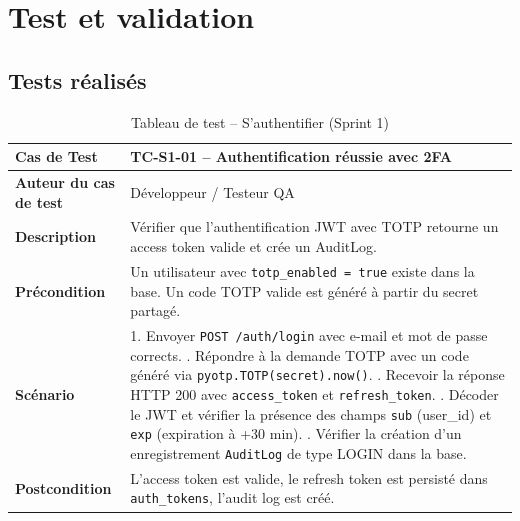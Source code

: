 \section{Test et validation}

\subsection{Tests réalisés}

\begin{table}[H]
\centering
\caption{Tableau de test -- S'authentifier (Sprint 1)}
\label{tab:test-sprint1-auth}
\small
\renewcommand{\arraystretch}{1.3}
\begin{tabularx}{\textwidth}{>{\bfseries}p{3.5cm} X}
\hline
Cas de Test & TC-S1-01 -- Authentification réussie avec 2FA \\
\hline
Auteur du cas de test & Développeur / Testeur QA \\
\hline
Description & Vérifier que l'authentification JWT avec TOTP retourne un access token valide et crée un AuditLog. \\
\hline
Précondition & Un utilisateur avec \texttt{totp\_enabled = true} existe dans la base. Un code TOTP valide est généré à partir du secret partagé. \\
\hline
Scénario &
1. Envoyer \texttt{POST /auth/login} avec e-mail et mot de passe corrects. \newline
2. Répondre à la demande TOTP avec un code généré via \texttt{pyotp.TOTP(secret).now()}. \newline
3. Recevoir la réponse HTTP 200 avec \texttt{access\_token} et \texttt{refresh\_token}. \newline
4. Décoder le JWT et vérifier la présence des champs \texttt{sub} (user\_id) et \texttt{exp} (expiration à +30 min). \newline
5. Vérifier la création d'un enregistrement \texttt{AuditLog} de type LOGIN dans la base. \\
\hline
Postcondition & L'access token est valide, le refresh token est persisté dans \texttt{auth\_tokens}, l'audit log est créé. \\
\hline
\end{tabularx}
\end{table}

